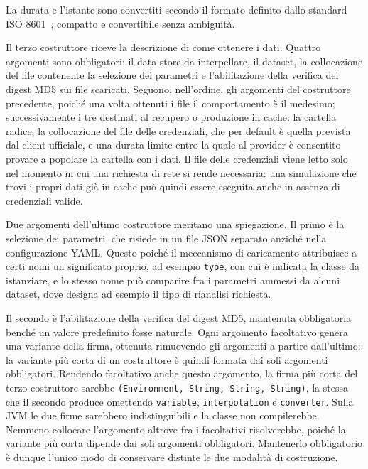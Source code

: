 La durata e l'istante sono convertiti secondo il formato definito dallo standard ISO
8601~\cite{iso8601}, compatto e convertibile senza ambiguità.

Il terzo costruttore riceve la descrizione di come ottenere i dati. Quattro argomenti sono
obbligatori: il data store da interpellare, il dataset, la collocazione del file contenente
la selezione dei parametri e l'abilitazione della verifica del digest MD5 sui file scaricati.
Seguono, nell'ordine, gli argomenti del costruttore precedente, poiché una volta ottenuti i
file il comportamento è il medesimo; successivamente i tre destinati al recupero o produzione in cache: la
cartella radice, la collocazione del file delle credenziali, che per default è quella
prevista dal client ufficiale, e una durata limite entro la quale al provider è consentito
provare a popolare la cartella con i dati. Il file delle credenziali viene letto solo nel momento in cui
una richiesta di rete si rende necessaria: una simulazione che trovi i propri dati già in
cache può quindi essere eseguita anche in assenza di credenziali valide.

Due argomenti dell'ultimo costruttore meritano una spiegazione. Il primo è la selezione dei
parametri, che risiede in un file JSON separato anziché nella configurazione YAML. Questo
poiché il meccanismo di caricamento attribuisce a certi nomi un significato proprio, ad
esempio \texttt{type}, con cui è indicata la classe da istanziare, e lo stesso nome può
comparire fra i parametri ammessi da alcuni dataset, dove designa ad esempio il tipo di
rianalisi richiesta. 

Il secondo è l'abilitazione della verifica del digest MD5, mantenuta obbligatoria
benché un valore predefinito fosse naturale. Ogni argomento facoltativo genera una
variante della firma, ottenuta rimuovendo gli argomenti a partire dall'ultimo: la
variante più corta di un costruttore è quindi formata dai soli argomenti obbligatori.
Rendendo facoltativo anche questo argomento, la firma più corta del terzo costruttore
sarebbe \texttt{(Environment, String, String, String)}, la stessa che il secondo
produce omettendo \texttt{variable}, \texttt{interpolation} e \texttt{converter}.
Sulla \ac{JVM} le due firme sarebbero
indistinguibili e la classe non compilerebbe. Nemmeno collocare l'argomento altrove
fra i facoltativi risolverebbe, poiché la variante più corta dipende dai soli
argomenti obbligatori. Mantenerlo obbligatorio è dunque l'unico modo di conservare
distinte le due modalità di costruzione.

